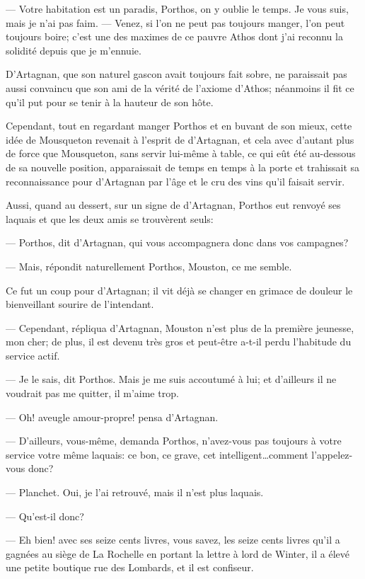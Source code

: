 — Votre habitation est un paradis, Porthos, on y oublie le temps. Je vous suis, mais je n'ai pas faim.
— Venez, si l'on ne peut pas toujours manger, l'on peut toujours boire; c'est une des maximes de ce pauvre Athos dont j'ai reconnu la solidité depuis que je m'ennuie.

D'Artagnan, que son naturel gascon avait toujours fait sobre, ne paraissait pas aussi convaincu que son ami de la vérité de l'axiome d'Athos; néanmoins il fit ce qu'il put pour se tenir à la hauteur de son hôte.

Cependant, tout en regardant manger Porthos et en buvant de son mieux, cette idée de Mousqueton revenait à l'esprit de d'Artagnan, et cela avec d'autant plus de force que Mousqueton, sans servir lui-même à table, ce qui eût été au-dessous de sa nouvelle position, apparaissait de temps en temps à la porte et trahissait sa reconnaissance pour d'Artagnan par l'âge et le cru des vins qu'il faisait servir.

Aussi, quand au dessert, sur un signe de d'Artagnan, Porthos eut renvoyé ses laquais et que les deux amis se trouvèrent seuls:

— Porthos, dit d'Artagnan, qui vous accompagnera donc dans vos campagnes?

— Mais, répondit naturellement Porthos, Mouston, ce me semble.

Ce fut un coup pour d'Artagnan; il vit déjà se changer en grimace de douleur le bienveillant sourire de l'intendant.

— Cependant, répliqua d'Artagnan, Mouston n'est plus de la première jeunesse, mon cher; de plus, il est devenu très gros et peut-être a-t-il perdu l'habitude du service actif.

— Je le sais, dit Porthos. Mais je me suis accoutumé à lui; et d'ailleurs il ne voudrait pas me quitter, il m'aime trop.

— Oh! aveugle amour-propre! pensa d'Artagnan.

— D'ailleurs, vous-même, demanda Porthos, n'avez-vous pas toujours à votre service votre même laquais: ce bon, ce grave, cet intelligent\dots comment l'appelez-vous donc?

— Planchet. Oui, je l'ai retrouvé, mais il n'est plus laquais.

— Qu'est-il donc?

— Eh bien! avec ses seize cents livres, vous savez, les seize cents livres qu'il a gagnées au siège de La Rochelle en portant la lettre à lord de Winter, il a élevé une petite boutique rue des Lombards, et il est confiseur.

